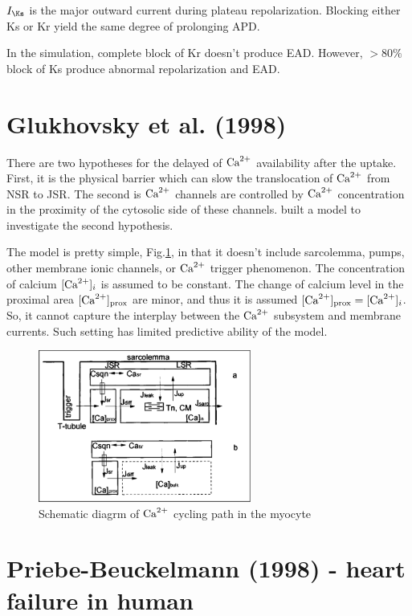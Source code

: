 $I_\Ks$ is the major outward current during plateau repolarization. Blocking
either Ks or Kr yield the same degree of prolonging APD. 

In the simulation, complete block of Kr doesn't produce EAD. However, $> 80\%$
block of Ks produce abnormal repolarization and EAD. 


\section{Glukhovsky et al. (1998)}
\label{sec:glukhovsky_1998}

There are two hypotheses for the delayed of ${\text{Ca}^{2+}}$ availability after the uptake.
First, it is the physical barrier which can slow the translocation of ${\text{Ca}^{2+}}$ 
from NSR to JSR. The second is ${\text{Ca}^{2+}}$ channels are controlled by ${\text{Ca}^{2+}}$
concentration in the proximity of the cytosolic side of these channels. 
\citep{glukhovsky1998} built a model to investigate the second hypothesis. 

The model is pretty simple, Fig.\ref{fig:Glukhovsky_Ca-cycling}, in that it
doesn't include sarcolemma, pumps, other membrane ionic channels, or ${\text{Ca}^{2+}}$
trigger phenomenon. The concentration of calcium $[{\text{Ca}^{2+}}]_i$ is assumed to be constant.
The change of calcium level in the proximal area $[{\text{Ca}^{2+}}]_\text{prox}$ are minor,
and thus it is assumed $[{\text{Ca}^{2+}}]_\text{prox} = [{\text{Ca}^{2+}}]_i$. So, it cannot capture the
interplay between the ${\text{Ca}^{2+}}$ subsystem and membrane currents. Such setting has
limited predictive ability of the model.

\begin{figure}[hbt]
 \centerline{\includegraphics[height=5cm]{./images/Glukhovsky_Ca-cycling.eps}}
\caption{Schematic diagrm of ${\text{Ca}^{2+}}$ cycling path in the myocyte}
\label{fig:Glukhovsky_Ca-cycling}
\end{figure}



\section{Priebe-Beuckelmann (1998) - heart failure in human}
\label{sec:priebe-beukelmann_1998}

